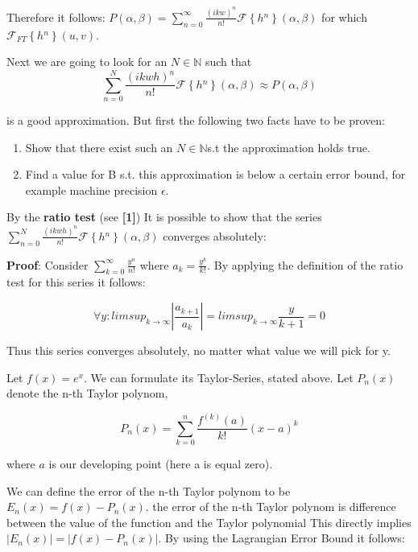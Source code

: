 Therefore it follows: $P(\alpha,\beta)=\sum_{n=0}^{\infty}\frac{(ikw)^{n}}{n!}\mathcal{F}\left\{ h{}^{n}\right\} (\alpha,\beta)$ for which $\mathcal{F}_{FT}\left\{ h{}^{n}\right\} (u,v)$.

Next we are going to look for an $N\mathbb{\in N}$ such that 
\begin{equation}
 \sum_{n=0}^{N}\frac{(ikwh)^{n}}{n!}\mathcal{F}\left\{ h{}^{n}\right\} (\alpha,\beta) \approx P(\alpha,\beta) 
\end{equation}

is a good approximation. But first the following two facts have to be proven:

\begin{enumerate}
\item Show that there exist such an $N\mathbb{\in N}$s.t the approximation
holds true.
\item Find a value for B s.t. this approximation is below a certain error
bound, for example machine precision $\epsilon$. 
\end{enumerate}


By the \textbf{ratio test} (see \textbf{{[}1{]}}) 
It is possible to show that the series $\sum_{n=0}^{N}\frac{(ikwh)^{n}}{n!}\mathcal{F}\left\{ h{}^{n}\right\} (\alpha,\beta)$ converges absolutely:

\textbf{Proof}: Consider $\sum_{k=0}^{\infty}\frac{y^{n}}{n!}$ where
$a_{k}=\frac{y^{k}}{k!}$. By applying the definition of the ratio test for this series it follows: 

\begin{equation}
 \forall y:limsup_{k\rightarrow\infty}|\frac{a_{k+1}}{a_{k}}|=limsup_{k\rightarrow\infty}\frac{y}{k+1}=0 
\end{equation}

Thus this series converges absolutely, no matter what value we will
pick for y.

Let $f(x)=e^{x}$. We can formulate its Taylor-Series, stated above.
Let $P_{n}(x)$denote the n-th Taylor polynom, 

\begin{equation}
 P_{n}(x)=\sum_{k=0}^{n}\frac{f^{(k)}(a)}{k!}(x-a)^{k}
\end{equation}

where $a$ is our developing point (here a is equal zero). 

We can define the error of the n-th Taylor polynom to be $E_{n}(x)=f(x)-P_{n}(x)$.
the error of the n-th Taylor polynom is difference between the value of the function and the Taylor polynomial
This directly implies $|E_{n}(x)|=|f(x)-P_{n}(x)|$. By using the Lagrangian Error Bound it follows: 

